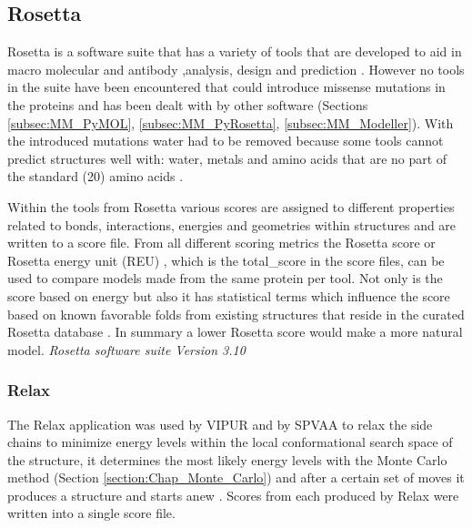 \subsection{Rosetta}
Rosetta is a software suite that has a variety of tools that are developed to aid in macro molecular and antibody ,analysis, design and prediction \cite{rosetta_commons_about_nodate}.
However no tools in the suite have been encountered that could introduce missense mutations in the proteins and has been dealt with by other software (Sections \ref{subsec:MM_PyMOL}, \ref{subsec:MM_PyRosetta}, \ref{subsec:MM_Modeller}). With the introduced mutations water had to be removed because some tools cannot predict structures well with: water, metals and amino acids that are no part of the standard (20) amino acids \cite{rosetta_commons_how_nodate}.

Within the tools from Rosetta various scores are assigned to different properties related to bonds, interactions, energies and geometries within structures and are written to a score file. From all different scoring metrics the Rosetta score or Rosetta energy unit (REU) , which is the total\_score in the score files, can be used to compare models made from the same protein per tool. Not only is the score based on energy but also it has statistical terms which influence the score based on known favorable folds from existing structures that reside in the curated Rosetta database \cite{shourya_scoring_nodate}. In summary a lower Rosetta score would make a more natural model.
\label{subsec:MM_Rosetta}
\newline
\textit{Rosetta software suite Version 3.10}

\subsubsection{Relax}
The Relax application was used by VIPUR and by SPVAA to relax the side chains to minimize energy levels within the local conformational search space \cite{rosetta_commons_relax_nodate} of the structure, it determines the most likely energy levels with the Monte Carlo method (Section \ref{section:Chap_Monte_Carlo}) and after a certain set of moves it produces a structure and starts anew \cite{conway_relaxation_2014,tyka_alternate_2011}. Scores from each produced by Relax were written into a single score file.
\label{subsubsec:MM_Relax}

